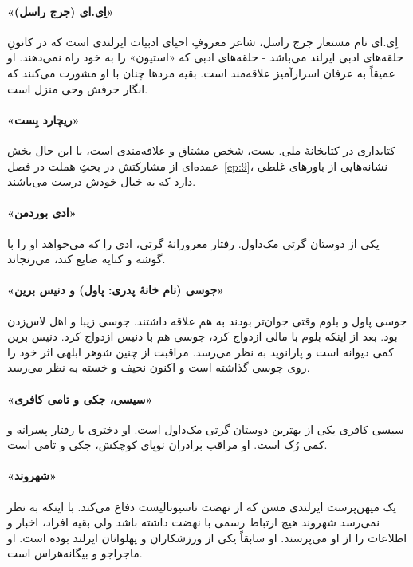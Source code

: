 \documentclass[12pt]{book}
\newcommand{\noun}[1]{«{#1}»}
\begin{document}
    \paragraph{\noun{اِی.ای (جرج راسل)}\protect{}}
    اِی.ای نام مستعار جرج راسل، شاعر معروفِ احیای ادبیات ایرلندی است که در کانونِ حلقه‌های ادبی ایرلند می‌باشد - حلقه‌های ادبی که \noun{استیون} را به خود راه نمی‌دهند. او عمیقاً به عرفان اسرارآمیز علاقه‌مند است. بقیه مردها چنان با او مشورت می‌کنند که انگار حرفش وحی منزل است.
    \paragraph{\noun{ریچارد بِست}\protect{}}
    کتابداری در کتابخانۀ ملی. بست، شخص مشتاق و علاقه‌مندی است، با این حال بخش عمده‌ای از مشارکتش در بحثِ هملت در فصل~\ref{ep:9}، نشانه‌هایی از باورهای غلطی دارد که به خیال خودش درست می‌باشند.
    \paragraph{\noun{ادی بوردمن}\protect{}}
    یکی از دوستان گرتی مک‌داول. رفتار مغرورانۀ گرتی، ادی را که می‌خواهد او را با گوشه و کنایه ضایع کند، می‌رنجاند.
    \paragraph{\noun{جوسی (نام خانۀ پدری: پاول) و دنیس برین}\protect{}}
    جوسی پاول و بلوم وقتی جوان‌تر بودند به هم علاقه داشتند. جوسی زیبا و اهل لاس‌زدن بود. بعد از اینکه بلوم با مالی ازدواج کرد، جوسی هم با دنیس ازدواج کرد. دنیس برین کمی دیوانه است و پارانوید به نظر می‌رسد. مراقبت از چنین شوهر ابلهی اثر خود را روی جوسی گذاشته است و اکنون نحیف و خسته به نظر می‌رسد.
    \paragraph{\noun{سیسی، جکی و تامی کافری}\protect{}}
    سیسی کافری یکی از بهترین دوستان گرتی مک‌داول است. او دختری با رفتار پسرانه و کمی رُک است. او مراقب برادران نوپای کوچکش، جکی و تامی است.
    \paragraph{\noun{شهروند}\protect{}}
    یک میهن‌پرست ایرلندی مسن که از نهضت ناسیونالیست دفاع می‌کند. با اینکه به نظر نمی‌رسد شهروند هیچ ارتباط رسمی با نهضت داشته باشد ولی بقیه افراد، اخبار و اطلاعات را از او می‌پرسند. او سابقاً یکی از ورزشکاران و پهلوانان ایرلند بوده است. او ماجراجو و بیگانه‌هراس است.
\end{document}
